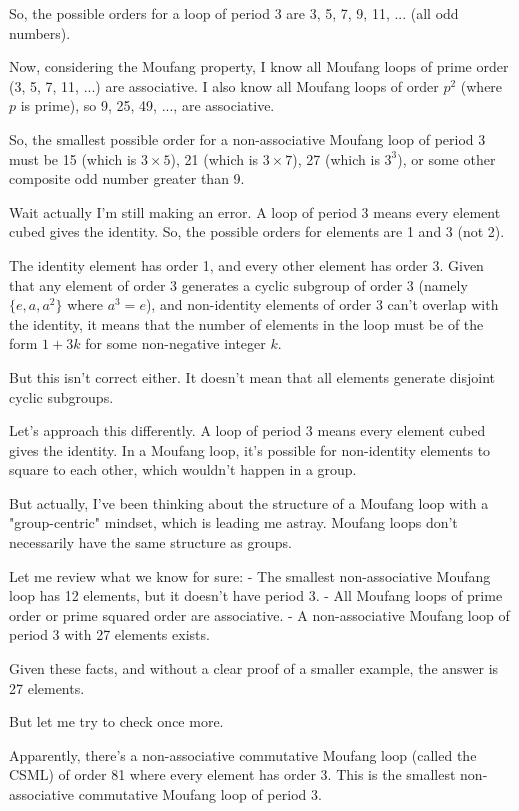 \documentclass[12p]{article}
\newcounter{reasoningcounter}
\newenvironment{reasoning}[1][]
{\refstepcounter{reasoningcounter}%
\begin{tcolorbox}[
    title=Reasoning \thereasoningcounter: #1,
    colback=white, %
    colframe=gray,
    coltext=black, %
    fonttitle=\bfseries\normalsize,
    top=2mm,
    bottom=2mm,
    enlarge top initially by=5mm
]
\small
}
{\end{tcolorbox}}
\begin{document}
\begin{reasoning}
So, the possible orders for a loop of period 3 are 3, 5, 7, 9, 11, ... (all odd numbers).

Now, considering the Moufang property, I know all Moufang loops of prime order (3, 5, 7, 11, ...) are associative. I also know all Moufang loops of order $p^2$ (where $p$ is prime), so 9, 25, 49, ..., are associative.

So, the smallest possible order for a non-associative Moufang loop of period 3 must be 15 (which is $ 3 \times 5$), 21 (which is $3 \times 7$), 27 (which is $3^3$), or some other composite odd number greater than 9.

Wait actually I'm still making an error. A loop of period 3 means every element cubed gives the identity. So, the possible orders for elements are 1 and 3 (not 2). 

The identity element has order 1, and every other element has order 3. Given that any element of order 3 generates a cyclic subgroup of order 3 (namely $\{e, a, a^2\}$ where $a^3 = e$), and non-identity elements of order 3 can't overlap with the identity, it means that the number of elements in the loop must be of the form $1 + 3k$ for some non-negative integer $k$. 

But this isn't correct either. It doesn't mean that all elements generate disjoint cyclic subgroups. 

Let's approach this differently. A loop of period 3 means every element cubed gives the identity. In a Moufang loop, it's possible for non-identity elements to square to each other, which wouldn't happen in a group. 

But actually, I've been thinking about the structure of a Moufang loop with a "group-centric" mindset, which is leading me astray. Moufang loops don't necessarily have the same structure as groups.

Let me review what we know for sure:
- The smallest non-associative Moufang loop has 12 elements, but it doesn't have period 3.
- All Moufang loops of prime order or prime squared order are associative.
- A non-associative Moufang loop of period 3 with 27 elements exists.

Given these facts, and without a clear proof of a smaller example, the answer is 27 elements.

But let me try to check once more. 

Apparently, there's a non-associative commutative Moufang loop (called the CSML) of order 81 where every element has order 3. This is the smallest non-associative commutative Moufang loop of period 3. 


\end{reasoning}
\end{document}
